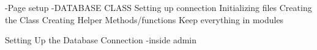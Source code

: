 -Page setup
-DATABASE CLASS
     Setting up connection
     Initializing files
     Creating the Class
     Creating Helper Methods/functions
     Keep everything in modules

Setting Up the Database Connection
     -inside admin